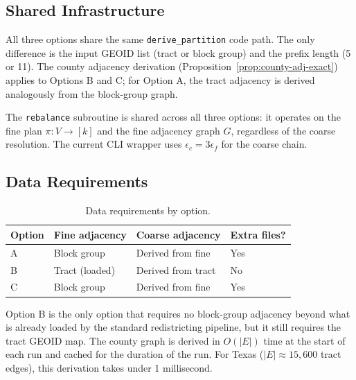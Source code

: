 \subsection{Shared Infrastructure}

All three options share the same \texttt{derive\_partition} code path.
The only difference is the input GEOID list (tract or block group) and the
prefix length (5 or 11).
The county adjacency derivation (Proposition~\ref{prop:county-adj-exact})
applies to Options B and C; for Option A, the tract adjacency is derived
analogously from the block-group graph.

The \texttt{rebalance} subroutine is shared across all three options:
it operates on the fine plan $\pi : V \to [k]$ and the fine adjacency graph
$G$, regardless of the coarse resolution.
The current CLI wrapper uses $\epsilon_c = 3\epsilon_f$ for the coarse chain.

\subsection{Data Requirements}

\begin{table}[h]
\centering
\caption{Data requirements by option.}
\label{tab:data-reqs}
\begin{tabular}{llll}
\toprule
Option & Fine adjacency & Coarse adjacency & Extra files? \\
\midrule
A & Block group & Derived from fine & Yes \\
B & Tract (loaded) & Derived from tract & No \\
C & Block group & Derived from fine & Yes \\
\bottomrule
\end{tabular}
\end{table}

Option B is the only option that requires no block-group adjacency beyond what
is already loaded by the standard redistricting pipeline, but it still requires
the tract GEOID map.
The county graph is derived in $O(|E|)$ time at the start of each \ms{} run
and cached for the duration of the run.
For Texas ($|E| \approx 15{,}600$ tract edges), this derivation takes under
1 millisecond.
